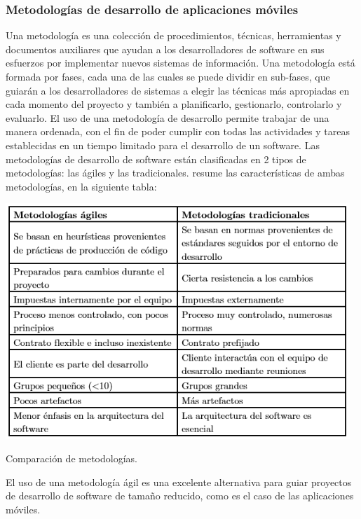 \documentclass[12pt,letterpaper,openany]{book}
\begin{document}
\subsubsection{Metodologías de desarrollo de aplicaciones móviles}
Una metodología es una colección de procedimientos, técnicas, herramientas y documentos auxiliares que ayudan a los desarrolladores de software en sus esfuerzos por implementar nuevos sistemas de información. Una metodología está formada por fases, cada una de las cuales se puede dividir en sub-fases, que guiarán a los desarrolladores de sistemas a elegir las técnicas más apropiadas en cada momento del proyecto y también a planificarlo, gestionarlo, controlarlo y evaluarlo.
\vspace{5mm}\newline
El uso de una metodología de desarrollo permite trabajar de una manera ordenada, con el fin de poder cumplir con todas las actividades y tareas establecidas en un tiempo limitado para el desarrollo de un software. 
\vspace{5mm}\newline
Las metodologías de desarrollo de software están clasificadas en 2 tipos de metodologías: las ágiles y las tradicionales. \cite{12} resume las características de ambas metodologías, en la siguiente tabla:

\begin{table}[H]
\centering
\includegraphics[width=13cm]{./imagenes/tablas/comparacion_metodologias}
\caption{Comparación de metodologías.}
\end{table}

El uso de una metodología ágil es una excelente alternativa para guiar proyectos de desarrollo de software de tamaño reducido, como es el caso de las aplicaciones móviles. 
\end{document}
